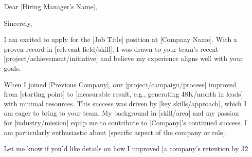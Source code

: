\documentclass[11pt,a4paper,roman]{moderncv}
\begin{document}
\date{\today}
\opening{Dear [Hiring Manager's Name],}
\closing{Sincerely,}
\makelettertitle


I am excited to apply for the [Job Title] position at [Company Name]. With a proven record in [relevant field/skill], I was drawn to your team's recent [project/achievement/initiative] and believe my experience aligns well with your goals.

When I joined [Previous Company], our [project/campaign/process] improved from [starting point] to [measurable result, e.g., generating 48K/month in leads] with minimal resources. This success was driven by [key skills/approach], which I am eager to bring to your team.
My background in [skill/area] and my passion for [industry/mission] equip me to contribute to [Company]'s continued success. I am particularly enthusiastic about [specific aspect of the company or role].

Let me know if you'd like details on how I improved [a company’s retention by 32%

\vspace{0.5cm}

\makeletterclosing

\end{document}
